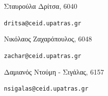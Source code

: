 \documentclass[a4paper,oneside,titlepage,10pt]{article}
\begin{document}
\begin{center}

\vspace{1.5cm}

Σταυρούλα Δρίτσα, 6040 \par
\texttt{dritsa@ceid.upatras.gr}

\vspace{0.5cm}

Νικόλαος Ζαχαρόπουλος, 6048 \par
\texttt{zachar@ceid.upatras.gr}

\vspace{0.5cm}

Δαμιανός Ντούμη - Σιγάλας, 6157 \par
\texttt{nsigalas@ceid.upatras.gr}


\end{center}



\end{document}
